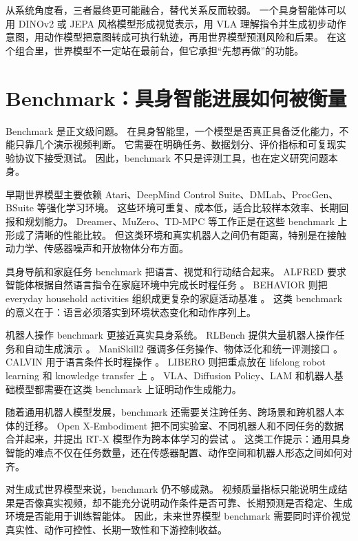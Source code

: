 \documentclass[11pt,a4paper]{ctexart}
\begin{document}
从系统角度看，三者最终更可能融合，替代关系反而较弱。
一个具身智能体可以用 DINOv2 或 JEPA 风格模型形成视觉表示，用 VLA 理解指令并生成初步动作意图，用动作模型把意图转成可执行轨迹，再用世界模型预测风险和后果。
在这个组合里，世界模型不一定站在最前台，但它承担“先想再做”的功能。

\section{Benchmark：具身智能进展如何被衡量}

Benchmark 是正文级问题。
在具身智能里，一个模型是否真正具备泛化能力，不能只靠几个演示视频判断。
它需要在明确任务、数据划分、评价指标和可复现实验协议下接受测试。
因此，benchmark 不只是评测工具，也在定义研究问题本身。

早期世界模型主要依赖 Atari、DeepMind Control Suite、DMLab、ProcGen、BSuite 等强化学习环境。
这些环境可重复、成本低，适合比较样本效率、长期回报和规划能力。
Dreamer、MuZero、TD-MPC 等工作正是在这些 benchmark 上形成了清晰的性能比较。
但这类环境和真实机器人之间仍有距离，特别是在接触动力学、传感器噪声和开放物体分布方面。

具身导航和家庭任务 benchmark 把语言、视觉和行动结合起来。
ALFRED 要求智能体根据自然语言指令在家庭环境中完成长时程任务 \cite{shridhar2020alfred}。
BEHAVIOR 则把 everyday household activities 组织成更复杂的家庭活动基准 \cite{srivastava2021behavior}。
这类 benchmark 的意义在于：语言必须落实到环境状态变化和动作序列上。

机器人操作 benchmark 更接近真实具身系统。
RLBench 提供大量机器人操作任务和自动生成演示 \cite{james2020rlbench}。
ManiSkill2 强调多任务操作、物体泛化和统一评测接口 \cite{gu2023maniskill2}。
CALVIN 用于语言条件长时程操作 \cite{mees2022calvin}。
LIBERO 则把重点放在 lifelong robot learning 和 knowledge transfer 上 \cite{liu2023libero}。
VLA、Diffusion Policy、LAM 和机器人基础模型都需要在这类 benchmark 上证明动作生成能力。

随着通用机器人模型发展，benchmark 还需要关注跨任务、跨场景和跨机器人本体的迁移。
Open X-Embodiment 把不同实验室、不同机器人和不同任务的数据合并起来，并提出 RT-X 模型作为跨本体学习的尝试 \cite{openx2023rtx}。
这类工作提示：通用具身智能的难点不仅在任务数量，还在传感器配置、动作空间和机器人形态之间如何对齐。

对生成式世界模型来说，benchmark 仍不够成熟。
视频质量指标只能说明生成结果是否像真实视频，却不能充分说明动作条件是否可靠、长期预测是否稳定、生成环境是否能用于训练智能体。
因此，未来世界模型 benchmark 需要同时评价视觉真实性、动作可控性、长期一致性和下游控制收益。
\end{document}
